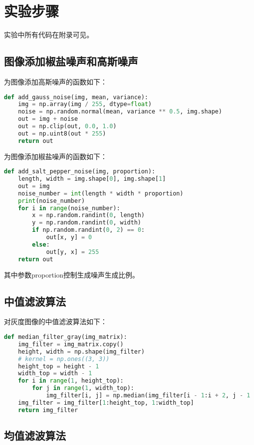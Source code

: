 \documentclass{hitreport}
\begin{document}
\section{实验步骤}

实验中所有代码在附录可见。

\subsection{图像添加椒盐噪声和高斯噪声}\label{sec:noise}

为图像添加高斯噪声的函数如下：
\begin{lstlisting}[language=python]
def add_gauss_noise(img, mean, variance):
    img = np.array(img / 255, dtype=float)
    noise = np.random.normal(mean, variance ** 0.5, img.shape)
    out = img + noise
    out = np.clip(out, 0.0, 1.0)
    out = np.uint8(out * 255)
    return out
\end{lstlisting}

为图像添加椒盐噪声的函数如下：
\begin{lstlisting}[language=python]
def add_salt_pepper_noise(img, proportion):
    length, width = img.shape[0], img.shape[1]
    out = img
    noise_number = int(length * width * proportion)
    print(noise_number)
    for i in range(noise_number):
        x = np.random.randint(0, length)
        y = np.random.randint(0, width)
        if np.random.randint(0, 2) == 0:
            out[x, y] = 0
        else:
            out[y, x] = 255
    return out
\end{lstlisting}
其中参数proportion控制生成噪声生成比例。

\subsection{中值滤波算法}\label{sec:median}

对灰度图像的中值滤波算法如下：
\begin{lstlisting}[language=python]
def median_filter_gray(img_matrix):
    img_filter = img_matrix.copy()
    height, width = np.shape(img_filter)
    # kernel = np.ones((3, 3))
    height_top = height - 1
    width_top = width - 1
    for i in range(1, height_top):
        for j in range(1, width_top):
            img_filter[i, j] = np.median(img_filter[i - 1:i + 2, j - 1:j + 2].copy().reshape((1, -1))[0])
    img_filter = img_filter[1:height_top, 1:width_top]
    return img_filter
\end{lstlisting}

\subsection{均值滤波算法}\label{sec:mean}
\end{document}
